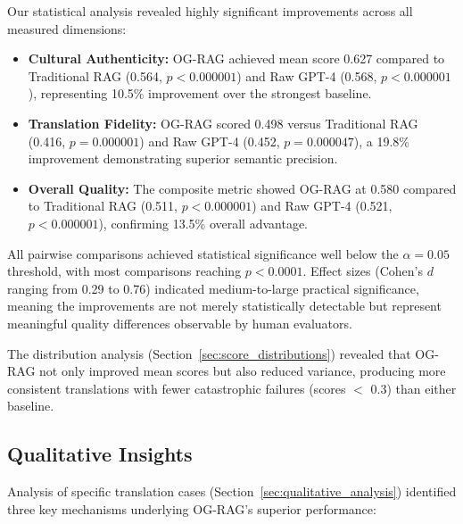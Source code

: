 Our statistical analysis revealed highly significant improvements across all measured dimensions:

\begin{itemize}
    \item \textbf{Cultural Authenticity:} OG-RAG achieved mean score 0.627 compared to Traditional RAG (0.564, $p < 0.000001$) and Raw GPT-4 (0.568, $p < 0.000001$), representing 10.5\% improvement over the strongest baseline.
    
    \item \textbf{Translation Fidelity:} OG-RAG scored 0.498 versus Traditional RAG (0.416, $p = 0.000001$) and Raw GPT-4 (0.452, $p = 0.000047$), a 19.8\% improvement demonstrating superior semantic precision.
    
    \item \textbf{Overall Quality:} The composite metric showed OG-RAG at 0.580 compared to Traditional RAG (0.511, $p < 0.000001$) and Raw GPT-4 (0.521, $p < 0.000001$), confirming 13.5\% overall advantage.
\end{itemize}

All pairwise comparisons achieved statistical significance well below the $\alpha = 0.05$ threshold, with most comparisons reaching $p < 0.0001$. Effect sizes (Cohen's $d$ ranging from 0.29 to 0.76) indicated medium-to-large practical significance, meaning the improvements are not merely statistically detectable but represent meaningful quality differences observable by human evaluators.

The distribution analysis (Section~\ref{sec:score_distributions}) revealed that OG-RAG not only improved mean scores but also reduced variance, producing more consistent translations with fewer catastrophic failures (scores $<$ 0.3) than either baseline.

\subsection{Qualitative Insights}
\label{subsec:qual_summary}

Analysis of specific translation cases (Section~\ref{sec:qualitative_analysis}) identified three key mechanisms underlying OG-RAG's superior performance:

